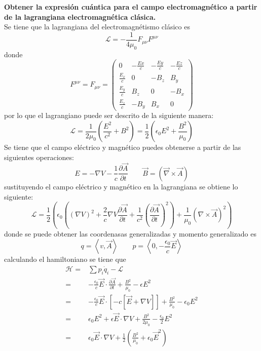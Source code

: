 \textbf{Obtener la expresión cuántica para el campo electromagnético a partir de la lagrangiana
electromagnética clásica.}\\
Se tiene que la lagrangiana del electromagnétismo clásico es
\begin{equation*}
    \mathcal{L}=-\frac{1}{4\mu_0}F_{\mu\nu}F^{\mu\nu}
\end{equation*}
donde
\begin{equation*}
    F^{\mu\nu}=F_{\mu\nu} = \left(\begin{matrix}
        0 & -\frac{Ex}{c} & -\frac{Ey}{c}   & -\frac{Ez}{c} \\
        \frac{E_x}{c} &  0  & -B_z & B_y \\
        \frac{E_y}{c} & B_z & 0 &-B_x \\
        \frac{E_z}{c} & -B_y & B_x & 0 
    \end{matrix}\right)
\end{equation*}
por lo que el lagrangiano puede ser descrito de la siguiente manera:
\begin{equation*}
    \mathcal{L}=\frac{1}{2\mu_0}\left(\frac{E^2}{c^2}+B^2\right)= \frac{1}{2}\left(\epsilon_0E^2+\frac{B^2}{\mu_0}\right)
\end{equation*}
Se tiene que el campo eléctrico y magnético puedes obtenerse a partir de las siguientes operaciones:
\begin{equation*}
    E=-\nabla V-\frac{1}{c}\frac{\partial \vec{A}}{\partial t} \qquad \vec{B}=  \left(\vec{\nabla}\times\vec{A}\right)
\end{equation*}
sustituyendo el campo eléctrico y magnético en la lagrangiana se obtiene lo siguiente:
\begin{equation*}
    \mathcal{L}=\frac{1}{2}\left(\epsilon_0 \left(\left(\nabla V\right)^2 +\frac{2}{c}\nabla V \frac{\partial \vec{A}}{\partial t}+\frac{1}{c^2}\left(\frac{\partial \vec{A}}{\partial t}\right)^2\right)+\frac{1}{\mu_0}\left(\nabla \times \vec{A}\right)^2\right)
\end{equation*}
donde se puede obtener las coordenasas generalizadas y momento generalizado es
\begin{equation*}
    q= \left\langle v,\vec{A} \right\rangle \qquad p=\left\langle 0,-\frac{\epsilon_0}{c}\vec{E}\right\rangle
\end{equation*}
calculando el hamiltoniano se tiene que
\begin{align*}
    \mathcal{H}=&\sum p_i\dot{q}_i - \mathcal{L}\\
    =& -\frac{\epsilon_0}{c}\vec{E}\cdot \frac{\partial \vec{A}}{\partial t}+ \frac{B^2}{\mu_0}- \epsilon E^2\\
    =& -\frac{\epsilon_0}{c}\vec{E}\cdot \left[-c \left[\vec{E}+\nabla V\right]\right]+\frac{B^2}{\mu_0}-\epsilon_0 E^2   \\
    =& \epsilon_0 E^2 + \epsilon \vec{E}\cdot \nabla V + \frac{B^2}{2\mu_0}-\frac{\epsilon_0}{2}E^2\\   
    =& \epsilon_0 \vec{E}\cdot \nabla V + \frac{1}{2}\left(\frac{B^2}{\mu_0}+\epsilon_0 \vec{E}^2\right)
\end{align*}
